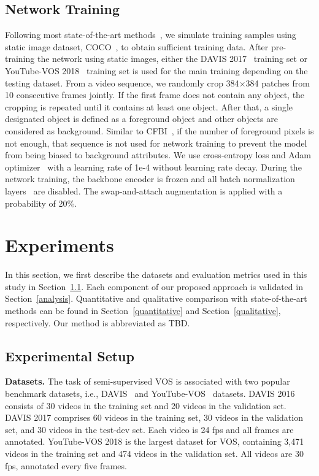\documentclass[runningheads]{llncs}
\begin{document}
\subsection{Network Training}
Following most state-of-the-art methods~\cite{STM, KMN, AFB-URR, RMNet, LCM}, we simulate training samples using static image dataset, COCO~\cite{COCO}, to obtain sufficient training data. After pre-training the network using static images, either the DAVIS 2017~\cite{DAVIS2017} training set or YouTube-VOS 2018~\cite{YTVOS} training set is used for the main training depending on the testing dataset. From a video sequence, we randomly crop 384$\times$384 patches from 10 consecutive frames jointly. If the first frame does not contain any object, the cropping is repeated until it contains at least one object. After that, a single designated object is defined as a foreground object and other objects are considered as background. Similar to CFBI~\cite{CFBI}, if the number of foreground pixels is not enough, that sequence is not used for network training to prevent the model from being biased to background attributes. We use cross-entropy loss and Adam optimizer~\cite{adam} with a learning rate of 1e-4 without learning rate decay. During the network training, the backbone encoder is frozen and all batch normalization layers~\cite{batchnorm} are disabled. The swap-and-attach augmentation is applied with a probability of 20\%.



\section{Experiments}
In this section, we first describe the datasets and evaluation metrics used in this study in Section~\ref{setup}. Each component of our proposed approach is validated in Section~\ref{analysis}. Quantitative and qualitative comparison with state-of-the-art methods can be found in Section~\ref{quantitative} and Section~\ref{qualitative}, respectively. Our method is abbreviated as TBD.



\subsection{Experimental Setup}
\label{setup}
\noindent\textbf{Datasets.} The task of semi-supervised VOS is associated with two popular benchmark datasets, i.e., DAVIS~\cite{DAVIS2016, DAVIS2017} and YouTube-VOS~\cite{YTVOS} datasets. DAVIS 2016 consists of 30 videos in the training set and 20 videos in the validation set. DAVIS 2017 comprises 60 videos in the training set, 30 videos in the validation set, and 30 videos in the test-dev set. Each video is 24 fps and all frames are annotated. YouTube-VOS 2018 is the largest dataset for VOS, containing 3,471 videos in the training set and 474 videos in the validation set. All videos are 30 fps, annotated every five frames.
\end{document}
